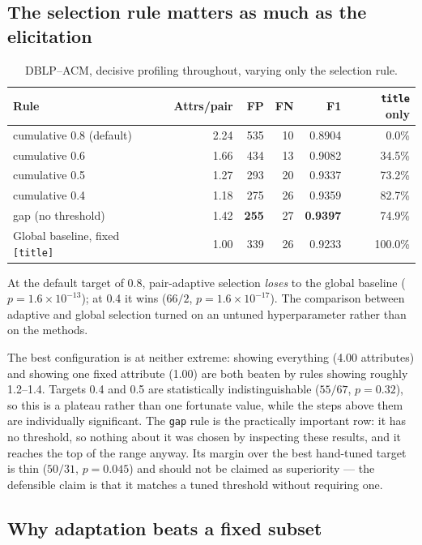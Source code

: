 \documentclass[11pt]{article}
\begin{document}
\subsection{The selection rule matters as much as the elicitation}
\label{sec:rule}

\begin{table}[h]
\centering
\begin{tabular}{lrrrrr}
\toprule
Rule & Attrs/pair & FP & FN & F1 & \texttt{title} only \\
\midrule
cumulative 0.8 (default) & 2.24 & 535 & 10 & 0.8904 &  0.0\% \\
cumulative 0.6           & 1.66 & 434 & 13 & 0.9082 & 34.5\% \\
cumulative 0.5           & 1.27 & 293 & 20 & 0.9337 & 73.2\% \\
cumulative 0.4           & 1.18 & 275 & 26 & 0.9359 & 82.7\% \\
gap (no threshold)       & 1.42 & \textbf{255} & 27 & \textbf{0.9397} & 74.9\% \\
\midrule
Global baseline, fixed \texttt{[title]} & 1.00 & 339 & 26 & 0.9233 & 100.0\% \\
\bottomrule
\end{tabular}
\caption{DBLP--ACM, decisive profiling throughout, varying only the selection rule.}
\end{table}

At the default target of 0.8, pair-adaptive selection \emph{loses} to the global baseline
($p = 1.6\times10^{-13}$); at 0.4 it wins ($66/2$, $p = 1.6\times10^{-17}$). The comparison
between adaptive and global selection turned on an untuned hyperparameter rather than on
the methods.

The best configuration is at neither extreme: showing everything (4.00 attributes) and
showing one fixed attribute (1.00) are both beaten by rules showing roughly 1.2--1.4.
Targets 0.4 and 0.5 are statistically indistinguishable ($55/67$, $p = 0.32$), so this is a
plateau rather than one fortunate value, while the steps above them are individually
significant. The \texttt{gap} rule is the practically important row: it has no threshold, so
nothing about it was chosen by inspecting these results, and it reaches the top of the range
anyway. Its margin over the best hand-tuned target is thin ($50/31$, $p = 0.045$) and should
not be claimed as superiority --- the defensible claim is that it matches a tuned threshold
without requiring one.

\subsection{Why adaptation beats a fixed subset}
\label{sec:mechanism}
\end{document}
